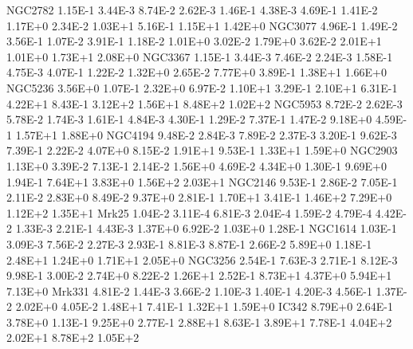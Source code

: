         NGC2782   1.15E-1  3.44E-3   8.74E-2  2.62E-3   1.46E-1  4.38E-3   4.69E-1  1.41E-2   1.17E+0  2.34E-2   1.03E+1  5.16E-1   1.15E+1  1.42E+0 
        NGC3077   4.96E-1  1.49E-2   3.56E-1  1.07E-2   3.91E-1  1.18E-2   1.01E+0  3.02E-2   1.79E+0  3.62E-2   2.01E+1  1.01E+0   1.73E+1  2.08E+0 
        NGC3367   1.15E-1  3.44E-3   7.46E-2  2.24E-3   1.58E-1  4.75E-3   4.07E-1  1.22E-2   1.32E+0  2.65E-2   7.77E+0  3.89E-1   1.38E+1  1.66E+0 
        NGC5236   3.56E+0  1.07E-1   2.32E+0  6.97E-2   1.10E+1  3.29E-1   2.10E+1  6.31E-1   4.22E+1  8.43E-1   3.12E+2  1.56E+1   8.48E+2  1.02E+2 
        NGC5953   8.72E-2  2.62E-3   5.78E-2  1.74E-3   1.61E-1  4.84E-3   4.30E-1  1.29E-2   7.37E-1  1.47E-2   9.18E+0  4.59E-1   1.57E+1  1.88E+0 
        NGC4194   9.48E-2  2.84E-3   7.89E-2  2.37E-3   3.20E-1  9.62E-3   7.39E-1  2.22E-2   4.07E+0  8.15E-2   1.91E+1  9.53E-1   1.33E+1  1.59E+0 
        NGC2903   1.13E+0  3.39E-2   7.13E-1  2.14E-2   1.56E+0  4.69E-2   4.34E+0  1.30E-1   9.69E+0  1.94E-1   7.64E+1  3.83E+0   1.56E+2  2.03E+1 
        NGC2146   9.53E-1  2.86E-2   7.05E-1  2.11E-2   2.83E+0  8.49E-2   9.37E+0  2.81E-1   1.70E+1  3.41E-1   1.46E+2  7.29E+0   1.12E+2  1.35E+1 
          Mrk25   1.04E-2  3.11E-4   6.81E-3  2.04E-4   1.59E-2  4.79E-4   4.42E-2  1.33E-3   2.21E-1  4.43E-3   1.37E+0  6.92E-2   1.03E+0  1.28E-1 
        NGC1614   1.03E-1  3.09E-3   7.56E-2  2.27E-3   2.93E-1  8.81E-3   8.87E-1  2.66E-2   5.89E+0  1.18E-1   2.48E+1  1.24E+0   1.71E+1  2.05E+0 
        NGC3256   2.54E-1  7.63E-3   2.71E-1  8.12E-3   9.98E-1  3.00E-2   2.74E+0  8.22E-2   1.26E+1  2.52E-1   8.73E+1  4.37E+0   5.94E+1  7.13E+0 
         Mrk331   4.81E-2  1.44E-3   3.66E-2  1.10E-3   1.40E-1  4.20E-3   4.56E-1  1.37E-2   2.02E+0  4.05E-2   1.48E+1  7.41E-1   1.32E+1  1.59E+0 
          IC342   8.79E+0  2.64E-1   3.78E+0  1.13E-1   9.25E+0  2.77E-1   2.88E+1  8.63E-1   3.89E+1  7.78E-1   4.04E+2  2.02E+1   8.78E+2  1.05E+2 
